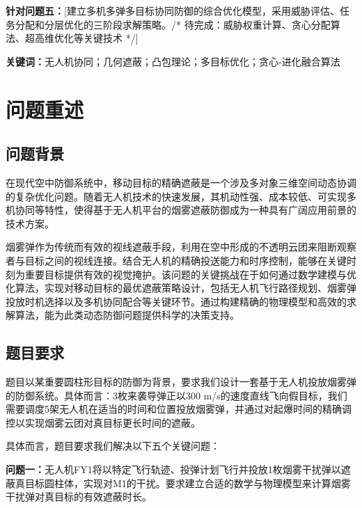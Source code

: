 \documentclass[fontset=SimSun]{ctexart}
\begin{document}
\textbf{针对问题五：}[建立多机多弹多目标协同防御的综合优化模型，采用威胁评估、任务分配和分层优化的三阶段求解策略。/* 待完成：威胁权重计算、贪心分配算法、超高维优化等关键技术 */]

\vfill

\noindent\hspace{2em}\textbf{关键词：}无人机协同；几何遮蔽；凸包理论；多目标优化；贪心-进化融合算法


\newpage

\section{问题重述}

\subsection{问题背景}

在现代空中防御系统中，移动目标的精确遮蔽是一个涉及多对象三维空间动态协调的复杂优化问题。随着无人机技术的快速发展，其机动性强、成本较低、可实现多机协同等特性，使得基于无人机平台的烟雾遮蔽防御成为一种具有广阔应用前景的技术方案。

烟雾弹作为传统而有效的视线遮蔽手段，利用在空中形成的不透明云团来阻断观察者与目标之间的视线连接。结合无人机的精确投送能力和时序控制，能够在关键时刻为重要目标提供有效的视觉掩护。该问题的关键挑战在于如何通过数学建模与优化算法，实现对移动目标的最优遮蔽策略设计，包括无人机飞行路径规划、烟雾弹投放时机选择以及多机协同配合等关键环节。通过构建精确的物理模型和高效的求解算法，能为此类动态防御问题提供科学的决策支持。

\subsection{题目要求}

题目以某重要圆柱形目标的防御为背景，要求我们设计一套基于无人机投放烟雾弹的防御系统。具体而言：3枚来袭导弹正以300 m/s的速度直线飞向假目标，我们需要调度5架无人机在适当的时间和位置投放烟雾弹，并通过对起爆时间的精确调控以实现烟雾云团对真目标更长时间的遮蔽。

具体而言，题目要求我们解决以下五个关键问题：

\textbf{问题一：}无人机FY1将以特定飞行轨迹、投弹计划飞行并投放1枚烟雾干扰弹以遮蔽真目标圆柱体，实现对M1的干扰。要求建立合适的数学与物理模型来计算烟雾干扰弹对真目标的有效遮蔽时长。
\end{document}
